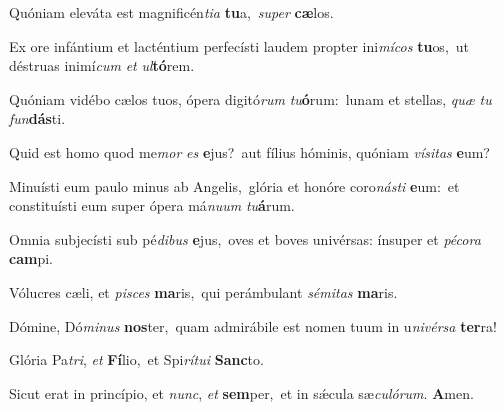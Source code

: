 ﻿Quóniam eleváta est magnificén\textit{ti}\textit{a} \textbf{tu}a,~\redgreheightstar \textit{su}\textit{per} \textbf{cæ}los.

Ex ore infántium et lacténtium perfecísti laudem propter ini\textit{mí}\textit{cos} \textbf{tu}os,~\redgreheightstar ut déstruas inimí\textit{cum} \textit{et} \textit{ul}\textbf{tó}rem.

Quóniam vidébo cælos tuos, ópera digitó\textit{rum} \textit{tu}\textbf{ó}rum:~\redgreheightstar lunam et stellas, \textit{quæ} \textit{tu} \textit{fun}\textbf{dás}ti.

Quid est homo quod me\textit{mor} \textit{es} \textbf{e}jus?~\redgreheightstar aut fílius hóminis, quóniam \textit{ví}\textit{si}\textit{tas} \textbf{e}um?

Minuísti eum paulo minus ab Angelis,~\reddagger glória et honóre coro\textit{nás}\textit{ti} \textbf{e}um:~\redgreheightstar et constituísti eum super ópera má\textit{nu}\textit{um} \textit{tu}\textbf{á}rum.

Omnia subjecísti sub pé\textit{di}\textit{bus} \textbf{e}jus,~\redgreheightstar oves et boves univérsas: ínsuper et \textit{pé}\textit{co}\textit{ra} \textbf{cam}pi.

Vólucres cæli, et \textit{pi}\textit{sces} \textbf{ma}ris,~\redgreheightstar qui perámbulant \textit{sé}\textit{mi}\textit{tas} \textbf{ma}ris.

Dómine, Dó\textit{mi}\textit{nus} \textbf{nos}ter,~\redgreheightstar quam admirábile est nomen tuum in u\textit{ni}\textit{vér}\textit{sa} \textbf{ter}ra!

Glória Pa\textit{tri}, \textit{et} \textbf{Fí}lio,~\redgreheightstar et Spi\textit{rí}\textit{tu}\textit{i} \textbf{Sanc}to.

Sicut erat in princípio, et \textit{nunc}, \textit{et} \textbf{sem}per,~\redgreheightstar et in sǽcula sæ\textit{cu}\textit{ló}\textit{rum}. \textbf{A}men.
